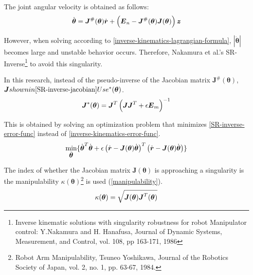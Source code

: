 The joint angular velocity is obtained as follows:
\begin{eqnarray}
 \dot{\bm{\theta}} = \bm{J}^{\#}(\bm{\theta})\dot{\bm{r}} + 
  \left(\bm{E}_n - \bm{J}^{\#}(\bm{\theta})\bm{J}(\bm{\theta})\right)\bm{z}
  \eqlabel{inverse-kinematics-lagrangian-formula}
\end{eqnarray}

However, when solving according to \eqref{inverse-kinematics-lagrangian-formula}, $\left|\dot{\bm{\theta}}\right|$ becomes large and unstable behavior occurs.
Therefore, Nakamura et al.'s SR-Inverse\footnote{Inverse kinematic solutions with singularity robustness for robot
Manipulator control: Y.Nakamura and H. Hanafusa, Journal of Dynamic Systems, Measurement, and Control, vol. 108, pp 163-171, 1986} to avoid this singularity.

In this research, instead of the pseudo-inverse of the Jacobian matrix $\bm{J}^{\#}(\bm{\theta})$, $\bm{J} shown in \eqref{SR-inverse-jacobian} Use ^{*}(\bm{\theta})$.
\begin{eqnarray}
 \bm{J}^{*}(\bm{\theta})
  = \bm{J}^T\left(\bm{J}\bm{J}^T + \epsilon \bm{E}_m\right)^{-1}
 \eqlabel{SR-inverse-jacobian}
\end{eqnarray}

This is obtained by solving an optimization problem that minimizes \eqref{SR-inverse-error-func} instead of \eqref{inverse-kinematics-error-func}.
\begin{eqnarray}
 \min_{\dot{\bm{\theta}}}
\{
 \dot{\bm{\theta}}^T \dot{\bm{\theta}}
+
\epsilon
\left(\dot{\bm{r}} - \bm{J}(\bm{\theta})\dot{\bm{\theta}}\right)^T
\left(\dot{\bm{r}} - \bm{J}(\bm{\theta})\dot{\bm{\theta}}\right)
\}
 \eqlabel{SR-inverse-error-func}
\end{eqnarray}

The index of whether the Jacobian matrix $\bm{J}(\bm{\theta})$ is approaching a singularity is the manipulability $\kappa(\bm{\theta})$\footnote{Robot Arm Manipulability, Tsuneo Yoshikawa, Journal of the Robotics Society of Japan, vol. 2, no. 1, pp. 63-67, 1984.} is used (\eqref{manipulability}).
\begin{eqnarray}
 \kappa(\bm{\theta}) = \sqrt{\bm{J}(\bm{\theta}) \bm{J}^{T}(\bm{\theta})}
  \eqlabel{manipulability}
\end{eqnarray}


